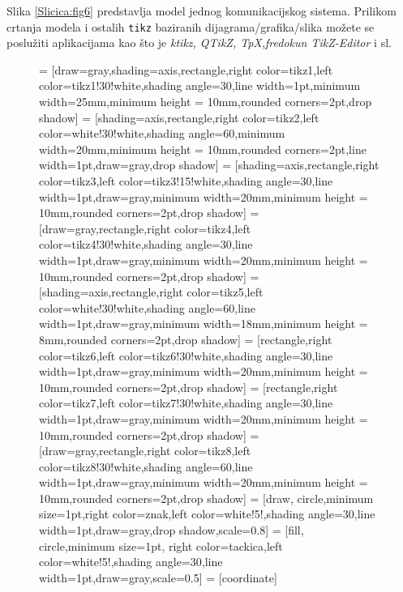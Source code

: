 \documentclass[letterpaper,10pt]{article}
\begin{document}
\noindent{}Slika \ref{Slicica:fig6} predstavlja model jednog komunikacijskog sistema. Prilikom crtanja modela i ostalih \texttt{tikz} baziranih dijagrama/grafika/slika možete se poslužiti aplikacijama kao što je \textsl{ktikz, QTikZ, TpX,fredokun TikZ-Editor} i sl.\\
\newpage
\begin{figure}[h]
\centering{}
 = [draw=gray,shading=axis,rectangle,right color=tikz1,left color=tikz1!30!white,shading angle=30,line width=1pt,minimum width=25mm,minimum height = 10mm,rounded corners=2pt,drop shadow]
 = [shading=axis,rectangle,right color=tikz2,left color=white!30!white,shading angle=60,minimum width=20mm,minimum height = 10mm,rounded corners=2pt,line width=1pt,draw=gray,drop shadow]
 = [shading=axis,rectangle,right color=tikz3,left color=tikz3!15!white,shading angle=30,line width=1pt,draw=gray,minimum width=20mm,minimum height = 10mm,rounded corners=2pt,drop shadow]
 = [draw=gray,rectangle,right color=tikz4,left color=tikz4!30!white,shading angle=30,line width=1pt,draw=gray,minimum width=20mm,minimum height = 10mm,rounded corners=2pt,drop shadow]
 = [shading=axis,rectangle,right color=tikz5,left color=white!30!white,shading angle=60,line width=1pt,draw=gray,minimum width=18mm,minimum height = 8mm,rounded corners=2pt,drop shadow]
 = [rectangle,right color=tikz6,left color=tikz6!30!white,shading angle=30,line width=1pt,draw=gray,minimum width=20mm,minimum height = 10mm,rounded corners=2pt,drop shadow]
 = [rectangle,right color=tikz7,left color=tikz7!30!white,shading angle=30,line width=1pt,draw=gray,minimum width=20mm,minimum height = 10mm,rounded corners=2pt,drop shadow]
 = [draw=gray,rectangle,right color=tikz8,left color=tikz8!30!white,shading angle=60,line width=1pt,draw=gray,minimum width=20mm,minimum height = 10mm,rounded corners=2pt,drop shadow]
 = [draw, circle,minimum size=1pt,right color=znak,left color=white!5!,shading angle=30,line width=1pt,draw=gray,drop shadow,scale=0.8]
 = [fill, circle,minimum size=1pt, right color=tackica,left color=white!5!,shading angle=30,line width=1pt,draw=gray,scale=0.5]
 = [coordinate]
\end{figure}
\end{document}
